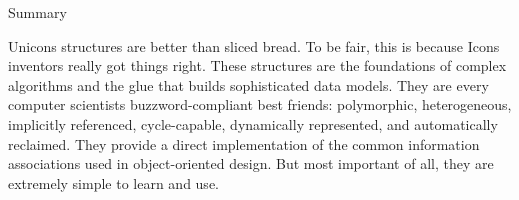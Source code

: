 
{\sffamily
Summary}

Unicon{\textquotesingle}s structures are better than sliced bread. To be
fair, this is because Icon{\textquotesingle}s inventors really got
things right. These structures are the foundations of complex
algorithms and the glue that builds sophisticated data models. They are
every computer scientists{\textquotesingle} buzzword-compliant best
friends: polymorphic, heterogeneous, implicitly referenced,
cycle-capable, dynamically represented, and automatically reclaimed.
They provide a direct implementation of the common information
associations used in object-oriented design. But most important of all,
they are extremely simple to learn and use.


\bigskip

\clearpage
\bigskip
